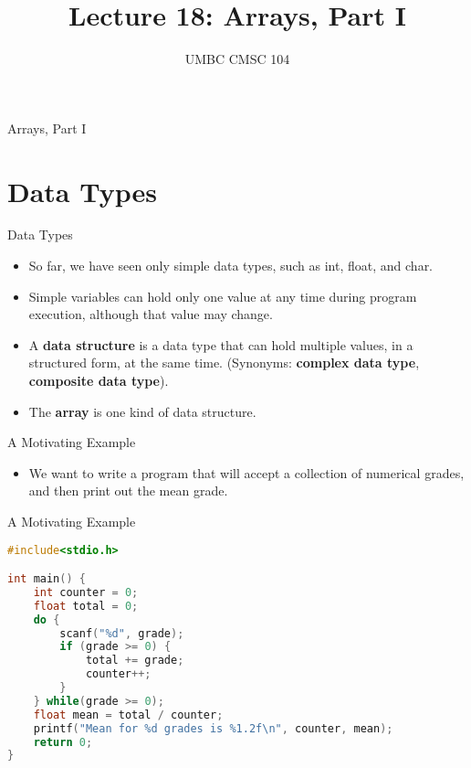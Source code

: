 \documentclass[graphics]{beamer}
\title{Lecture 18: Arrays, Part I}
\author{UMBC CMSC 104}
\date{}
\begin{document}
\begin{frame}{}
\centering
    Arrays, Part I
\end{frame}

\frame{\tableofcontents}

\section{Data Types}
\begin{frame}{Data Types}
    \begin{itemize}
        \item So far, we have seen only simple data types, such as int, float, and char.
        \item Simple variables can hold only one value at any time during program execution, although that value may change.
        \item A \textbf{data structure} is a data type that can hold multiple values, in a structured form, at the same time.  (Synonyms:  \textbf{complex data type}, \textbf{composite data type}).
        \item The \textbf{array} is one kind of data structure.
    \end{itemize}
\end{frame}

\begin{frame}{A Motivating Example}
    \begin{itemize}
        \item We want to write a program that will accept a collection of numerical grades, and then print out the mean grade.
    \end{itemize}
\end{frame}

\begin{frame}[fragile]{A Motivating Example}
    \begin{lstlisting}[language=C,basicstyle=\footnotesize,keywordstyle=\color{blue},commentstyle=\color{green},showstringspaces=false,stringstyle=\color{red}]
#include<stdio.h>

int main() {
    int counter = 0;
    float total = 0;
    do {
        scanf("%d", grade);
        if (grade >= 0) {
            total += grade;
            counter++;
        }
    } while(grade >= 0);
    float mean = total / counter;
    printf("Mean for %d grades is %1.2f\n", counter, mean);
    return 0;
}
    \end{lstlisting}
\end{frame}
\end{document}
